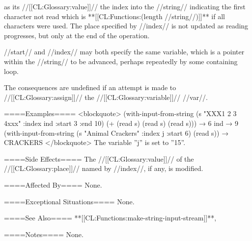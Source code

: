 as its //[[CL:Glossary:value]]// the index into the //string// indicating the first character not read which is **[[CL:Functions:(length //string//)]]** if all characters were used. The place specified by //index// is not updated as reading progresses, but only at the end of the operation.

//start// and //index// may both specify the same variable, which is a pointer within the //string// to be advanced, perhaps repeatedly by some containing loop.

The consequences are undefined if an attempt is made to //[[CL:Glossary:assign]]// the //[[CL:Glossary:variable]]// //var//.

====Examples====
<blockquote> (with-input-from-string (s "XXX1 2 3 4xxx" :index ind :start 3 :end 10) (+ (read s) (read s) (read s))) → 6 ind → 9 (with-input-from-string (s "Animal Crackers" :index j :start 6) (read s)) → CRACKERS </blockquote> The variable ''j'' is set to ''15''.

====Side Effects====
The //[[CL:Glossary:value]]// of the //[[CL:Glossary:place]]// named by //index//, if any, is modified.

====Affected By====
None.

====Exceptional Situations====
None.

====See Also====
**[[CL:Functions:make-string-input-stream]]**,

{\secref\TraversalRules}

====Notes====
None.

     
